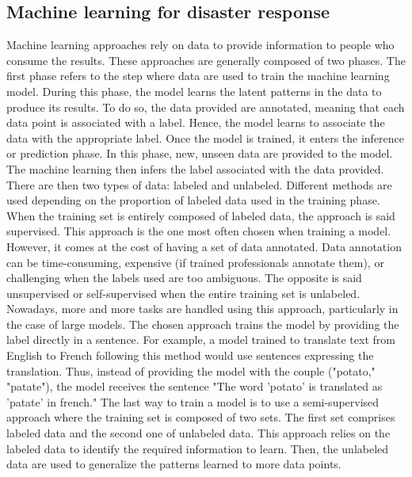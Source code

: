 \subsection{Machine learning for disaster response}
Machine learning approaches rely on data to provide information to people who consume the results.
These approaches are generally composed of two phases.
The first phase refers to the step where data are used to train the machine learning model.
During this phase, the model learns the latent patterns in the data to produce its results.
To do so, the data provided are annotated, meaning that each data point is associated with a label.
Hence, the model learns to associate the data with the appropriate label.
Once the model is trained, it enters the inference or prediction phase.
In this phase, new, unseen data are provided to the model.
The machine learning then infers the label associated with the data provided.
There are then two types of data: labeled and unlabeled.
Different methods are used depending on the proportion of labeled data used in the training phase.
When the training set is entirely composed of labeled data, the approach is said supervised.
This approach is the one most often chosen when training a model.
However, it comes at the cost of having a set of data annotated.
Data annotation can be time-consuming, expensive (if trained professionals annotate them), or challenging when the labels used are too ambiguous.
The opposite is said unsupervised or self-supervised when the entire training set is unlabeled.
Nowadays, more and more tasks are handled using this approach, particularly in the case of large models.
The chosen approach trains the model by providing the label directly in a sentence.
For example, a model trained to translate text from English to French following this method would use sentences expressing the translation.
Thus, instead of providing the model with the couple ("potato," "patate"), the model receives the sentence "The word 'potato' is translated as 'patate' in french."
The last way to train a model is to use a semi-supervised approach where the training set is composed of two sets.
The first set comprises labeled data and the second one of unlabeled data.
This approach relies on the labeled data to identify the required information to learn.
Then, the unlabeled data are used to generalize the patterns learned to more data points.

